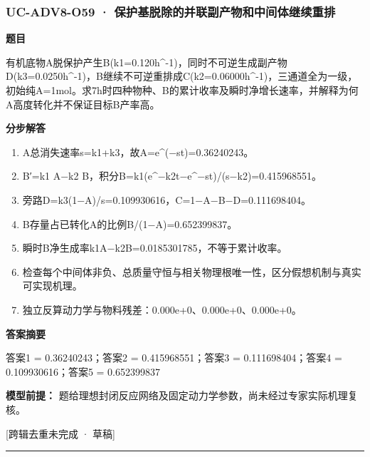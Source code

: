 \documentclass[UTF8,11pt,a4paper]{ctexart}
\begin{document}
\subsubsection*{UC-ADV8-O59 · 保护基脱除的并联副产物和中间体继续重排}
\noindent\textbf{题目}\par
有机底物A脱保护产生B(k1=0.120h\textasciicircum{}-1)，同时不可逆生成副产物D(k3=0.0250h\textasciicircum{}-1)，B继续不可逆重排成C(k2=0.06000h\textasciicircum{}-1)，三通道全为一级，初始纯A=1mol。求7h时四种物种、B的累计收率及瞬时净增长速率，并解释为何A高度转化并不保证目标B产率高。\par
\medskip\noindent\textbf{分步解答}
\begin{enumerate}
\item A总消失速率s=k1+k3，故A=e\textasciicircum{}(−st)=0.36240243。
\item B′=k1 A−k2 B，积分B=k1(e\textasciicircum{}−k2t−e\textasciicircum{}−st)/(s−k2)=0.415968551。
\item 旁路D=k3(1−A)/s=0.109930616，C=1−A−B−D=0.111698404。
\item B存量占已转化A的比例B/(1−A)=0.652399837。
\item 瞬时B净生成率k1A−k2B=0.0185301785，不等于累计收率。
\item 检查每个中间体非负、总质量守恒与相关物理根唯一性，区分假想机制与真实可实现机理。
\item 独立反算动力学与物料残差：0.000e+0、0.000e+0、0.000e+0。
\end{enumerate}
\noindent\textbf{答案摘要}\par
答案1 = 0.36240243；答案2 = 0.415968551；答案3 = 0.111698404；答案4 = 0.109930616；答案5 = 0.652399837\par
\noindent\textbf{模型前提：}
题给理想封闭反应网络及固定动力学参数，尚未经过专家实际机理复核。\par
\noindent\textcolor{red!65!black}{[跨辑去重未完成 · 草稿]} \par
\medskip\hrule\medskip
{}
\end{document}
